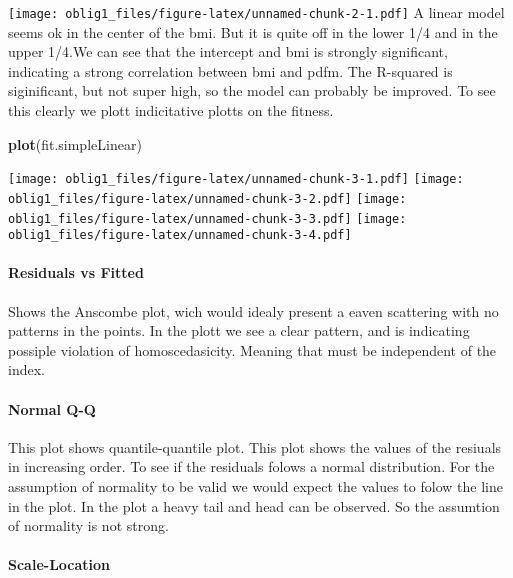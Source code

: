 \documentclass[
]{article}
\newenvironment{Shaded}{\begin{snugshade}}{\end{snugshade}}
\newcommand{\KeywordTok}[1]{\textcolor[rgb]{0.13,0.29,0.53}{\textbf{#1}}}
\newcommand{\NormalTok}[1]{#1}
\begin{document}
\texttt{[image: oblig1\_files/figure-latex/unnamed-chunk-2-1.pdf]} A
linear model seems ok in the center of the bmi. But it is quite off in
the lower 1/4 and in the upper 1/4.We can see that the intercept and bmi
is strongly significant, indicating a strong correlation between bmi and
pdfm. The R-squared is siginificant, but not super high, so the model
can probably be improved. To see this clearly we plott indicitative
plotts on the fitness.

\begin{Shaded}
\begin{Highlighting}[]
\KeywordTok{plot}\NormalTok{(fit.simpleLinear)}
\end{Highlighting}
\end{Shaded}

\texttt{[image: oblig1\_files/figure-latex/unnamed-chunk-3-1.pdf]}
\texttt{[image: oblig1\_files/figure-latex/unnamed-chunk-3-2.pdf]}
\texttt{[image: oblig1\_files/figure-latex/unnamed-chunk-3-3.pdf]}
\texttt{[image: oblig1\_files/figure-latex/unnamed-chunk-3-4.pdf]}

\hypertarget{residuals-vs-fitted}{%
\paragraph{Residuals vs Fitted}\label{residuals-vs-fitted}}

Shows the Anscombe plot, wich would idealy present a eaven scattering
with no patterns in the points. In the plott we see a clear pattern, and
is indicating possiple violation of homoscedasicity. Meaning that
\epsiplon must be independent of the index.

\hypertarget{normal-q-q}{%
\paragraph{Normal Q-Q}\label{normal-q-q}}

This plot shows quantile-quantile plot. This plot shows the values of
the resiuals in increasing order. To see if the residuals folows a
normal distribution. For the assumption of normality to be valid we
would expect the values to folow the line in the plot. In the plot a
heavy tail and head can be observed. So the assumtion of normality is
not strong.

\hypertarget{scale-location}{%
\paragraph{Scale-Location}\label{scale-location}}
\end{document}
